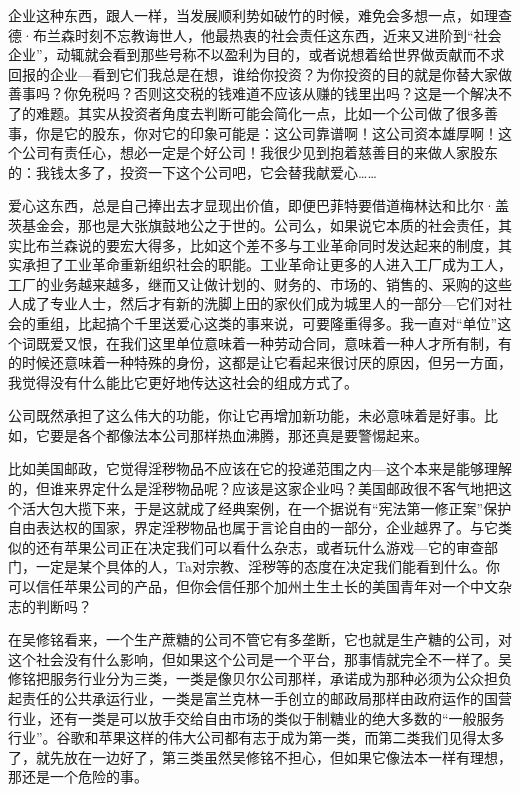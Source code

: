 企业这种东西，跟人一样，当发展顺利势如破竹的时候，难免会多想一点，如理查德·布兰森时刻不忘教诲世人，他最热衷的社会责任这东西，近来又进阶到``社会企业''，动辄就会看到那些号称不以盈利为目的，或者说想着给世界做贡献而不求回报的企业---看到它们我总是在想，谁给你投资？为你投资的目的就是你替大家做善事吗？你免税吗？否则这交税的钱难道不应该从赚的钱里出吗？这是一个解决不了的难题。其实从投资者角度去判断可能会简化一点，比如一个公司做了很多善事，你是它的股东，你对它的印象可能是：这公司靠谱啊！这公司资本雄厚啊！这个公司有责任心，想必一定是个好公司！我很少见到抱着慈善目的来做人家股东的：我钱太多了，投资一下这个公司吧，它会替我献爱心\ldots\ldots{}

爱心这东西，总是自己捧出去才显现出价值，即便巴菲特要借道梅林达和比尔·盖茨基金会，那也是大张旗鼓地公之于世的。公司么，如果说它本质的社会责任，其实比布兰森说的要宏大得多，比如这个差不多与工业革命同时发达起来的制度，其实承担了工业革命重新组织社会的职能。工业革命让更多的人进入工厂成为工人，工厂的业务越来越多，继而又让做计划的、财务的、市场的、销售的、采购的这些人成了专业人士，然后才有新的洗脚上田的家伙们成为城里人的一部分---它们对社会的重组，比起搞个千里送爱心这类的事来说，可要隆重得多。我一直对``单位''这个词既爱又恨，在我们这里单位意味着一种劳动合同，意味着一种人才所有制，有的时候还意味着一种特殊的身份，这都是让它看起来很讨厌的原因，但另一方面，我觉得没有什么能比它更好地传达这社会的组成方式了。

公司既然承担了这么伟大的功能，你让它再增加新功能，未必意味着是好事。比如，它要是各个都像法本公司那样热血沸腾，那还真是要警惕起来。

比如美国邮政，它觉得淫秽物品不应该在它的投递范围之内---这个本来是能够理解的，但谁来界定什么是淫秽物品呢？应该是这家企业吗？美国邮政很不客气地把这个活大包大揽下来，于是这就成了经典案例，在一个据说有``宪法第一修正案''保护自由表达权的国家，界定淫秽物品也属于言论自由的一部分，企业越界了。与它类似的还有苹果公司正在决定我们可以看什么杂志，或者玩什么游戏---它的审查部门，一定是某个具体的人，Ta对宗教、淫秽等的态度在决定我们能看到什么。你可以信任苹果公司的产品，但你会信任那个加州土生土长的美国青年对一个中文杂志的判断吗？

在吴修铭看来，一个生产蔗糖的公司不管它有多垄断，它也就是生产糖的公司，对这个社会没有什么影响，但如果这个公司是一个平台，那事情就完全不一样了。吴修铭把服务行业分为三类，一类是像贝尔公司那样，承诺成为那种必须为公众担负起责任的公共承运行业，一类是富兰克林一手创立的邮政局那样由政府运作的国营行业，还有一类是可以放手交给自由市场的类似于制糖业的绝大多数的``一般服务行业''。谷歌和苹果这样的伟大公司都有志于成为第一类，而第二类我们见得太多了，就先放在一边好了，第三类虽然吴修铭不担心，但如果它像法本一样有理想，那还是一个危险的事。

